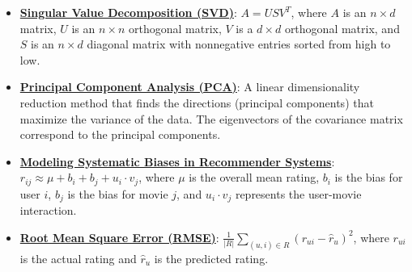 \documentclass{article}%
\begin{document}
\begin{itemize}[leftmargin=*]%
\item \href{https://purdue.brightspace.com/d2l/common/assets/pdfjs-d2l-dist/1.0.14-legacy/web/viewer.html?file=\%2Fcontent\%2Fenforced\%2F1095467-wl.202510.CS.24300.001\%2F11L2-svd-pca-recommender.pdf\%3Fou\%3D1095467\&lang=en-us\&container=d2l-fileviewer-rendered-pdf\&fullscreen=d2l-fileviewer-rendered-pdf-dialog\&height=667#page=10}{\textbf{Singular Value Decomposition (SVD)}}: $A = USV^T$, where $A$ is an $n \times d$ matrix, $U$ is an $n \times n$ orthogonal matrix, $V$ is a $d \times d$ orthogonal matrix, and $S$ is an $n \times d$ diagonal matrix with nonnegative entries sorted from high to low.%
\item \href{https://purdue.brightspace.com/d2l/common/assets/pdfjs-d2l-dist/1.0.14-legacy/web/viewer.html?file=\%2Fcontent\%2Fenforced\%2F1095467-wl.202510.CS.24300.001\%2F11L2-svd-pca-recommender.pdf\%3Fou\%3D1095467\&lang=en-us\&container=d2l-fileviewer-rendered-pdf\&fullscreen=d2l-fileviewer-rendered-pdf-dialog\&height=667#page=15}{\textbf{Principal Component Analysis (PCA)}}: A linear dimensionality reduction method that finds the directions (principal components) that maximize the variance of the data. The eigenvectors of the covariance matrix correspond to the principal components.%
\item \href{https://purdue.brightspace.com/d2l/common/assets/pdfjs-d2l-dist/1.0.14-legacy/web/viewer.html?file=\%2Fcontent\%2Fenforced\%2F1095467-wl.202510.CS.24300.001\%2F11L2-svd-pca-recommender.pdf\%3Fou\%3D1095467\&lang=en-us\&container=d2l-fileviewer-rendered-pdf\&fullscreen=d2l-fileviewer-rendered-pdf-dialog\&height=667#page=44}{\textbf{Modeling Systematic Biases in Recommender Systems}}: $r_{ij} \approx \mu + b_i + b_j + u_i \cdot v_j$, where $\mu$ is the overall mean rating, $b_i$ is the bias for user $i$, $b_j$ is the bias for movie $j$, and $u_i \cdot v_j$ represents the user-movie interaction.%
\item \href{https://purdue.brightspace.com/d2l/common/assets/pdfjs-d2l-dist/1.0.14-legacy/web/viewer.html?file=\%2Fcontent\%2Fenforced\%2F1095467-wl.202510.CS.24300.001\%2F11L2-svd-pca-recommender.pdf\%3Fou\%3D1095467\&lang=en-us\&container=d2l-fileviewer-rendered-pdf\&fullscreen=d2l-fileviewer-rendered-pdf-dialog\&height=667#page=49}{\textbf{Root Mean Square Error (RMSE)}}: $\frac{1}{|R|} \sum_{(u,i) \in R} (r_{ui} - \hat{r}_u)^2$, where $r_{ui}$ is the actual rating and $\hat{r}_u$ is the predicted rating.%
\end{itemize}%
\end{document}
